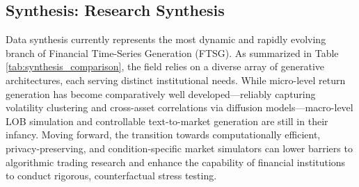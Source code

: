\subsection{Synthesis: Research Synthesis}

Data synthesis currently represents the most dynamic and rapidly evolving branch of Financial Time-Series Generation (FTSG). As summarized in Table \ref{tab:synthesis_comparison}, the field relies on a diverse array of generative architectures, each serving distinct institutional needs. While micro-level return generation has become comparatively well developed—reliably capturing volatility clustering and cross-asset correlations via diffusion models—macro-level LOB simulation and controllable text-to-market generation are still in their infancy. Moving forward, the transition towards computationally efficient, privacy-preserving, and condition-specific market simulators can lower barriers to algorithmic trading research and enhance the capability of financial institutions to conduct rigorous, counterfactual stress testing.
